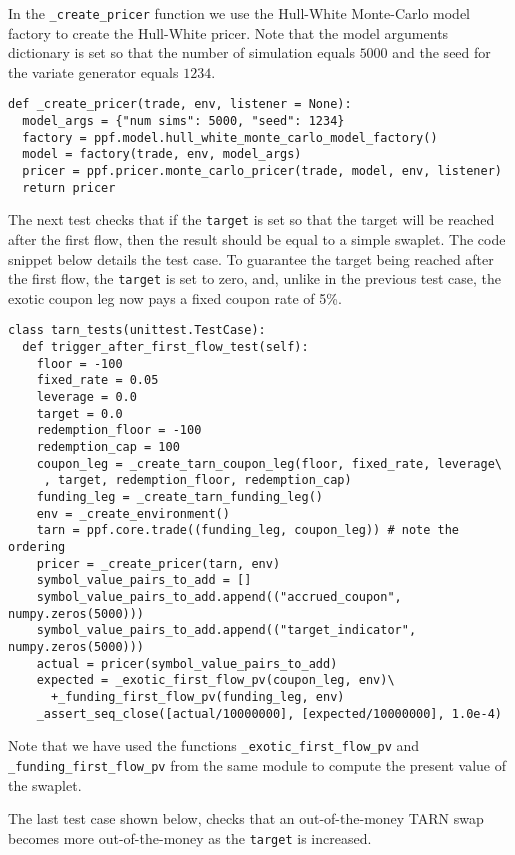 In the \verb|_create_pricer| function we use the Hull-White Monte-Carlo model factory to create the Hull-White pricer. Note that the model arguments dictionary is set so that the number of simulation equals $5000$ and the seed for the variate generator equals $1234$. 

\begin{verbatim}
def _create_pricer(trade, env, listener = None):
  model_args = {"num sims": 5000, "seed": 1234} 
  factory = ppf.model.hull_white_monte_carlo_model_factory()
  model = factory(trade, env, model_args)
  pricer = ppf.pricer.monte_carlo_pricer(trade, model, env, listener)
  return pricer
\end{verbatim}


The next test checks that if the \verb|target| is set so that the target will be reached after the first flow, then the result should be equal to a simple swaplet. 
The code snippet below details the test case. To guarantee the target being reached after the first flow, the \verb|target| is set to zero, and, unlike in the previous test case, the 
exotic coupon leg now pays a fixed coupon rate of 5\%.

\begin{verbatim}
class tarn_tests(unittest.TestCase):
  def trigger_after_first_flow_test(self):
    floor = -100
    fixed_rate = 0.05
    leverage = 0.0
    target = 0.0
    redemption_floor = -100
    redemption_cap = 100
    coupon_leg = _create_tarn_coupon_leg(floor, fixed_rate, leverage\
     , target, redemption_floor, redemption_cap)
    funding_leg = _create_tarn_funding_leg()
    env = _create_environment()
    tarn = ppf.core.trade((funding_leg, coupon_leg)) # note the ordering
    pricer = _create_pricer(tarn, env)
    symbol_value_pairs_to_add = []
    symbol_value_pairs_to_add.append(("accrued_coupon", numpy.zeros(5000)))
    symbol_value_pairs_to_add.append(("target_indicator", numpy.zeros(5000)))
    actual = pricer(symbol_value_pairs_to_add)
    expected = _exotic_first_flow_pv(coupon_leg, env)\
      +_funding_first_flow_pv(funding_leg, env)
    _assert_seq_close([actual/10000000], [expected/10000000], 1.0e-4)
\end{verbatim}
Note that we have used the functions \verb|_exotic_first_flow_pv| and \verb|_funding_first_flow_pv| from the same module to compute the present value of the swaplet.

The last test case shown below, checks that an out-of-the-money TARN swap becomes more out-of-the-money as the \verb|target| is increased.

